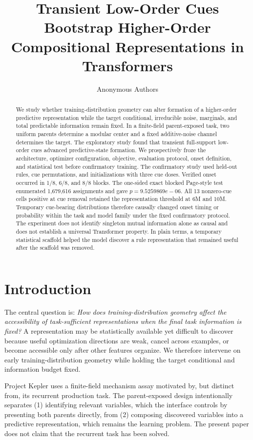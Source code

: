 \documentclass[11pt]{article}
\title{Transient Low-Order Cues Bootstrap Higher-Order Compositional Representations in Transformers}
\author{Anonymous Authors}
\date{}
\begin{document}
\maketitle

\begin{abstract}
We study whether training-distribution geometry can alter formation of a
higher-order predictive representation while the target conditional,
irreducible noise, marginals, and total predictable information remain fixed.
In a finite-field parent-exposed task, two uniform parents determine a modular
center and a fixed additive-noise channel determines the target. The
exploratory study found that transient full-support low-order cues advanced
predictive-state formation. We prospectively froze the architecture,
optimizer configuration, objective, evaluation protocol, onset definition,
and statistical test before confirmatory training. The confirmatory study used
held-out rules, cue permutations, and initializations with three cue doses.
Verified onset occurred in 1/8,
6/8, and 8/8 blocks. The
one-sided exact blocked Page-style test enumerated
1,679,616 assignments and gave
$p=9.5259869e-06$. All 13 nonzero-cue cells
positive at cue removal retained the representation threshold at 6M and 10M.
Temporary cue-bearing distributions therefore causally changed onset timing or
probability within the task and model family under the fixed confirmatory
protocol. The experiment does not
identify singleton mutual information alone as causal and does not establish a
universal Transformer property. In plain terms, a temporary statistical
scaffold helped the model discover a rule representation that remained useful
after the scaffold was removed.
\end{abstract}

\section{Introduction}
The central question is: \emph{How does training-distribution geometry affect
the accessibility of task-sufficient representations when the final task
information is fixed?} A representation may be statistically available yet
difficult to discover because useful optimization directions are weak, cancel
across examples, or become accessible only after other features organize. We
therefore intervene on early training-distribution geometry while holding the
target conditional and information budget fixed.

Project Kepler uses a finite-field mechanism assay motivated by, but distinct
from, its recurrent production task. The parent-exposed design intentionally
separates (1) identifying relevant variables, which the interface controls by
presenting both parents directly, from (2) composing discovered variables into
a predictive representation, which remains the learning problem. The present
paper does not claim that the recurrent task has been solved.
\end{document}
